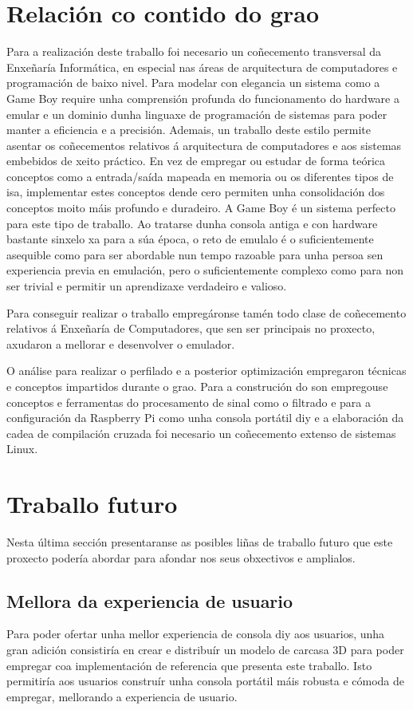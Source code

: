 \section{Relación co contido do grao}
Para a realización deste traballo foi necesario un coñecemento transversal da Enxeñaría Informática, en especial nas áreas de arquitectura de computadores e programación de baixo nivel.
Para modelar con elegancia un sistema como a Game Boy require unha comprensión profunda do funcionamento do hardware a emular
e un dominio dunha linguaxe de programación de sistemas para poder manter a eficiencia e a precisión.
Ademais, un traballo deste estilo permite asentar os coñecementos relativos á arquitectura de computadores e aos sistemas embebidos de xeito práctico.
En vez de empregar ou estudar de forma teórica conceptos como a entrada/saída mapeada en memoria ou os diferentes tipos de \acrshort{isa},
implementar estes conceptos dende cero permiten unha consolidación dos conceptos moito máis profundo e duradeiro.
A Game Boy é un sistema perfecto para este tipo de traballo. Ao tratarse dunha consola antiga e con hardware bastante sinxelo xa para a súa época,
o reto de emulalo é o suficientemente asequible como para ser abordable nun tempo razoable para unha persoa sen experiencia previa en emulación,
pero o suficientemente complexo como para non ser trivial e permitir un aprendizaxe verdadeiro e valioso.

Para conseguir realizar o traballo empregáronse tamén todo clase de coñecemento relativos á Enxeñaría de Computadores, que sen ser principais no proxecto,
axudaron a mellorar e desenvolver o emulador.

O análise para realizar o perfilado e a posterior optimización empregaron técnicas e conceptos impartidos durante o grao.
Para a construción do son empregouse conceptos e ferramentas do procesamento de sinal como o filtrado e para a 
configuración da Raspberry Pi como unha consola portátil \acrshort{diy} e a elaboración da cadea de 
compilación cruzada foi necesario un coñecemento extenso de sistemas Linux.



\section{Traballo futuro}
Nesta última sección presentaranse as posibles liñas de traballo futuro que este proxecto podería abordar para afondar nos seus obxectivos e amplialos.

\subsection{Mellora da experiencia de usuario}
Para poder ofertar unha mellor experiencia de consola \acrshort{diy} aos usuarios, unha gran adición consistiría en crear e distribuír un modelo de carcasa 3D
para poder empregar coa implementación de referencia que presenta este traballo.
Isto permitiría aos usuarios construír unha consola portátil máis robusta e cómoda de empregar, mellorando a experiencia de usuario.

